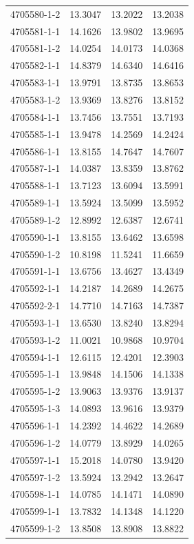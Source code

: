 \begin{longtable}{lrrr}
4705580-1-2 & 13.3047 & 13.2022 & 13.2038 \\
4705581-1-1 & 14.1626 & 13.9802 & 13.9695 \\
4705581-1-2 & 14.0254 & 14.0173 & 14.0368 \\
4705582-1-1 & 14.8379 & 14.6340 & 14.6416 \\
4705583-1-1 & 13.9791 & 13.8735 & 13.8653 \\
4705583-1-2 & 13.9369 & 13.8276 & 13.8152 \\
4705584-1-1 & 13.7456 & 13.7551 & 13.7193 \\
4705585-1-1 & 13.9478 & 14.2569 & 14.2424 \\
4705586-1-1 & 13.8155 & 14.7647 & 14.7607 \\
4705587-1-1 & 14.0387 & 13.8359 & 13.8762 \\
4705588-1-1 & 13.7123 & 13.6094 & 13.5991 \\
4705589-1-1 & 13.5924 & 13.5099 & 13.5952 \\
4705589-1-2 & 12.8992 & 12.6387 & 12.6741 \\
4705590-1-1 & 13.8155 & 13.6462 & 13.6598 \\
4705590-1-2 & 10.8198 & 11.5241 & 11.6659 \\
4705591-1-1 & 13.6756 & 13.4627 & 13.4349 \\
4705592-1-1 & 14.2187 & 14.2689 & 14.2675 \\
4705592-2-1 & 14.7710 & 14.7163 & 14.7387 \\
4705593-1-1 & 13.6530 & 13.8240 & 13.8294 \\
4705593-1-2 & 11.0021 & 10.9868 & 10.9704 \\
4705594-1-1 & 12.6115 & 12.4201 & 12.3903 \\
4705595-1-1 & 13.9848 & 14.1506 & 14.1338 \\
4705595-1-2 & 13.9063 & 13.9376 & 13.9137 \\
4705595-1-3 & 14.0893 & 13.9616 & 13.9379 \\
4705596-1-1 & 14.2392 & 14.4622 & 14.2689 \\
4705596-1-2 & 14.0779 & 13.8929 & 14.0265 \\
4705597-1-1 & 15.2018 & 14.0780 & 13.9420 \\
4705597-1-2 & 13.5924 & 13.2942 & 13.2647 \\
4705598-1-1 & 14.0785 & 14.1471 & 14.0890 \\
4705599-1-1 & 13.7832 & 14.1348 & 14.1220 \\
4705599-1-2 & 13.8508 & 13.8908 & 13.8822 \\

\end{longtable}
